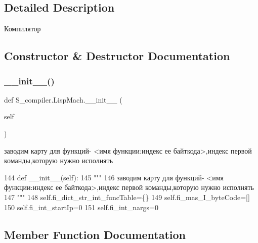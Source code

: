 \subsection{Detailed Description}
\begin{DoxyVerb}      Компилятор
\end{DoxyVerb}
 

\subsection{Constructor \& Destructor Documentation}
\mbox{\label{class_s__compiler_1_1_lisp_mach_ae8fc48aace9204d62bd03ab919f28006}} 
\subsubsection{\texorpdfstring{\+\_\+\+\_\+init\+\_\+\+\_\+()}{\_\_init\_\_()}}
{\footnotesize\ttfamily def S\+\_\+compiler.\+Lisp\+Mach.\+\_\+\+\_\+init\+\_\+\+\_\+ (\begin{DoxyParamCaption}\item[{}]{self }\end{DoxyParamCaption})}

\begin{DoxyVerb}   заводим карту для функций- <имя функции:индекс ее байткода>,индекс первой команды,которую нужно исполнять 
\end{DoxyVerb}
 
\begin{DoxyCode}
144  \textcolor{keyword}{def }\_\_init\_\_(self):
145   \textcolor{stringliteral}{"""}
146 \textcolor{stringliteral}{       заводим карту для функций- <имя функции:индекс ее байткода>,индекс первой команды,которую нужно
       исполнять }
147 \textcolor{stringliteral}{  """}     
148   self.fi\_dict\_str\_int\_funcTable=\{\}
149   self.fi\_mas\_I\_byteCode=[]
150   self.fi\_int\_startIp=0
151   self.fi\_int\_nargs=0
\end{DoxyCode}


\subsection{Member Function Documentation}
\mbox{\label{class_s__compiler_1_1_lisp_mach_ae9e76191e088fb5607dcc5f0b30bf831}} 
